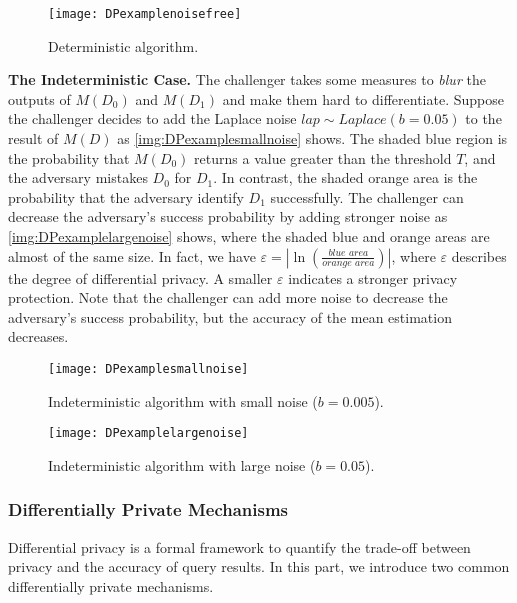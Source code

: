 \begin{figure}[htbp]
    \texttt{[image: DPexamplenoisefree]}
    \centering
    \caption{Deterministic algorithm.}
    \label{img:DPexamplenoisefree}
\end{figure}
\FloatBarrier

\textbf{The Indeterministic Case.}
The challenger takes some measures to \textit{blur} the outputs of $M\left( D_{0}\right)$ and $M\left( D_{1}\right)$ and make them hard to differentiate. Suppose the challenger decides to add the Laplace noise $lap\sim Laplace\left(b=0.05\right)$ to the result of $M\left(D\right)$ as \autoref{img:DPexamplesmallnoise} shows. The shaded blue region is the probability that $M\left( D_{0}\right)$ returns a value greater than the threshold $T$, and the adversary mistakes $D_{0}$ for $D_{1}$. In contrast, the shaded orange area is the probability that the adversary identify $D_{1}$ successfully. The challenger can decrease the adversary's success probability by adding stronger noise as \autoref{img:DPexamplelargenoise} shows, where the shaded blue and orange areas are almost of the same size. In fact, we have $\varepsilon=\left\lvert \ln \left( \frac{\textit{blue area}}{\textit{orange area}}\right)\right\rvert  $, where $\varepsilon$ describes the degree of differential privacy. A smaller $\varepsilon$ indicates a stronger privacy protection. Note that the challenger can add more noise to decrease the adversary's success probability, but the accuracy of the mean estimation decreases.


\begin{figure}[htbp]
    \texttt{[image: DPexamplesmallnoise]}
    \centering
    \caption{Indeterministic algorithm with small noise ($b=0.005$).}
    \label{img:DPexamplesmallnoise}
\end{figure}
\FloatBarrier

\begin{figure}[htbp]
    \texttt{[image: DPexamplelargenoise]}
    \centering
    \caption{Indeterministic algorithm with large noise ($b=0.05$).}
    \label{img:DPexamplelargenoise}
\end{figure}
\FloatBarrier

\subsubsection{Differentially Private Mechanisms}
\label{subsubsec:DPMechanisms}

Differential privacy is a formal framework to quantify the trade-off between privacy and the accuracy of query results. In this part, we introduce two common differentially private mechanisms.

